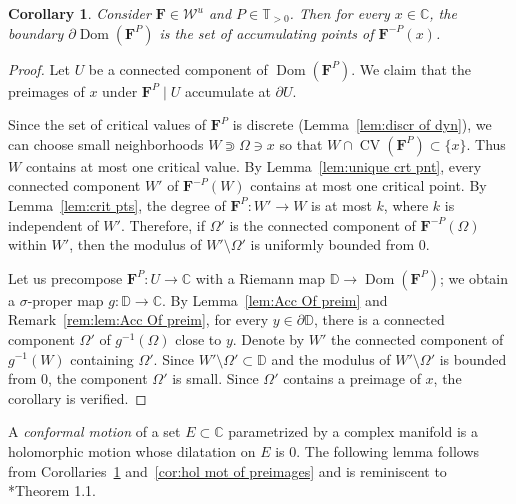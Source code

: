 \documentclass{amsart}
\newcommand{\Dom}{\operatorname {Dom}}
\newcommand{\1}{{\mathbb 1 }}
\newcommand\PT{\mathbb{ T}}
\newcommand{\bF}{{\mathbf F}}
\newcommand\Unst{{\boldsymbol{\mathcal{W}}^u}}
\newcommand{\C}{\mathbb{C}}
\newcommand{\Disk}{\mathbb{D}}
\newtheorem{cor}[thm]{Corollary}
\theoremstyle{remark}
\numberwithin{equation}{section}
\theoremstyle{definition}
\newcommand{\CV}{{\operatorname{CV}}}
\theoremstyle{nonumberbreak}
\begin{document}
\begin{cor}
\label{cor:preim accum at the boundary}
Consider $\bF\in \Unst$ and $P\in \PT_{>0}$. Then for every $x\in \C$, the boundary $\partial \Dom(\bF^P)$ is the set of accumulating points of $\bF^{-P}(x)$.
\end{cor}
\begin{proof}
Let $U$ be a connected component of $\Dom(\bF^P)$. We claim that the preimages of $x$ under $\bF^P\mid U$ accumulate at $\partial U$.
 

 Since the set of critical values of $\bF^P$ is discrete (Lemma~\ref{lem:discr of dyn}), we can choose small neighborhoods $W\Supset \Omega \ni x$ so that $W\cap \CV(\bF^P)\subset  \{x\}$. Thus $W$ contains at most one critical value. By Lemma~\ref{lem:unique crt pnt}, every connected component $W'$ of $\bF^{-P}(W)$ contains at most one critical point. By Lemma~\ref{lem:crit pts}, the degree of $\bF^P\colon W'\to W$ is at most $k$, where $k$ is independent of $W'$. Therefore, if $\Omega'$ is the connected component of $\bF^{-P}(\Omega)$ within $W'$, then the modulus of $W'\setminus \Omega'$ is uniformly bounded from $0$.
 
 
 
  Let us precompose $\bF^P\colon U\to \C$ with a Riemann map $\Disk\to  \Dom(\bF^P)$; we obtain a $\sigma$-proper map $g\colon \Disk\to \C$. By Lemma~\ref{lem:Acc Of preim} and Remark~\ref{rem:lem:Acc Of preim}, for every $y\in \partial \Disk$, there is a connected component $\Omega'$ of $g^{-1}(\Omega)$ close to $y$. Denote by $W'$ the connected component of $g^{-1}(W)$ containing $\Omega'$. Since $W'\setminus \Omega'\subset \Disk$ and the modulus of $W'\setminus \Omega'$ is bounded from $0$, the component $\Omega'$ is small. Since $\Omega'$ contains a preimage of $x$, the corollary is verified.
\end{proof}

A \emph{conformal motion} of a set $E\subset \C$ parametrized by a complex manifold is a holomorphic motion whose dilatation on $E$ is $0$. The following lemma follows from Corollaries~\ref{cor:preim accum at the boundary} and~\ref{cor:hol mot of preimages} and is reminiscent to \cite{Re}*{Theorem 1.1}. 
\end{document}
